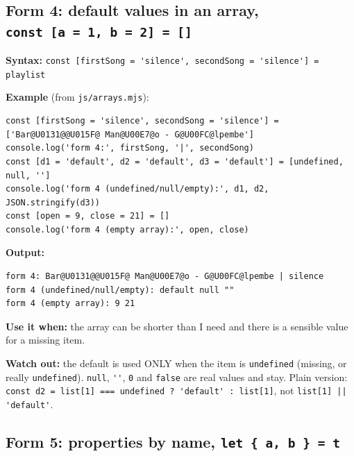 \subsection{\texorpdfstring{Form 4: default values in an array, \texttt{const\ {[}a\ =\ 1,\ b\ =\ 2{]}\ =\ {[}{]}}}{Form 4: default values in an array, const {[}a = 1, b = 2{]} = {[}{]}}}\label{form-4-default-values-in-an-array-const-a-1-b-2}

\textbf{Syntax:} \passthrough{\lstinline!const [firstSong = 'silence', secondSong = 'silence'] = playlist!}

\textbf{Example} (from \passthrough{\lstinline!js/arrays.mjs!}):

\begin{lstlisting}
const [firstSong = 'silence', secondSong = 'silence'] = ['Bar@U0131@@U015F@ Man@U00E7@o - G@U00FC@lpembe']
console.log('form 4:', firstSong, '|', secondSong)
const [d1 = 'default', d2 = 'default', d3 = 'default'] = [undefined, null, '']
console.log('form 4 (undefined/null/empty):', d1, d2, JSON.stringify(d3))
const [open = 9, close = 21] = []
console.log('form 4 (empty array):', open, close)
\end{lstlisting}

\textbf{Output:}

\begin{lstlisting}
form 4: Bar@U0131@@U015F@ Man@U00E7@o - G@U00FC@lpembe | silence
form 4 (undefined/null/empty): default null ""
form 4 (empty array): 9 21
\end{lstlisting}

\textbf{Use it when:} the array can be shorter than I need and there is a sensible value for a missing item.

\textbf{Watch out:} the default is used ONLY when the item is \passthrough{\lstinline!undefined!} (missing, or really \passthrough{\lstinline!undefined!}).
\passthrough{\lstinline!null!}, \passthrough{\lstinline!''!}, \passthrough{\lstinline!0!} and \passthrough{\lstinline!false!} are real values and stay. Plain version:
\passthrough{\lstinline!const d2 = list[1] === undefined ? 'default' : list[1]!}, not \passthrough{\lstinline!list[1] || 'default'!}.

\subsection{\texorpdfstring{Form 5: properties by name, \texttt{let\ \{\ a,\ b\ \}\ =\ t}}{Form 5: properties by name, let \{ a, b \} = t}}\label{form-5-properties-by-name-let-a-b-t}


